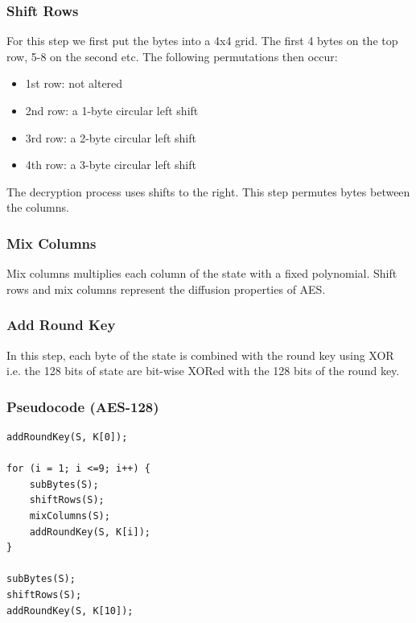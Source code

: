 \documentclass{article}
\begin{document}
\subsubsection{Shift Rows}
For this step we first put the bytes into a 4x4 grid. The first 4 bytes on the top row, 5-8 on the second etc. The following permutations then occur:
\begin{itemize}
	\item 1st row: not altered
	\item 2nd row: a 1-byte circular left shift
	\item 3rd row: a 2-byte circular left shift
	\item 4th row: a 3-byte circular left shift
\end{itemize}
The decryption process uses shifts to the right. This step permutes bytes between the columns.

\subsubsection{Mix Columns}
Mix columns multiplies each column of the state with a fixed polynomial. Shift rows and mix columns represent the diffusion properties of AES.

\subsubsection{Add Round Key}
In this step, each byte of the state is combined with the round key using XOR i.e. the 128 bits of state are bit-wise XORed with the 128 bits of the round key.

\subsubsection{Pseudocode (AES-128)}
\begin{lstlisting}
addRoundKey(S, K[0]);

for (i = 1; i <=9; i++) {
    subBytes(S);
    shiftRows(S);
    mixColumns(S);
    addRoundKey(S, K[i]);
}

subBytes(S);
shiftRows(S);
addRoundKey(S, K[10]);
\end{lstlisting}
\end{document}
